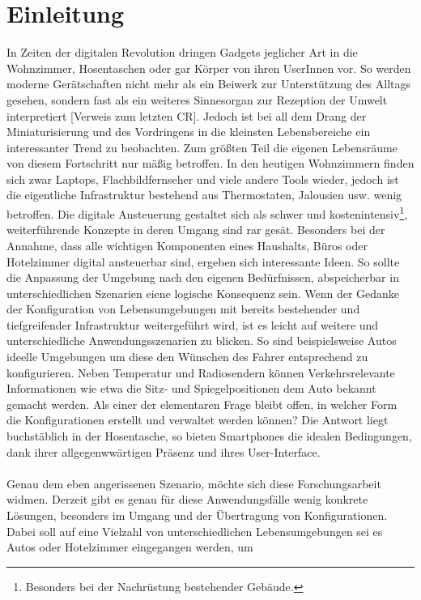\chapter{Einleitung}

In Zeiten der digitalen Revolution dringen Gadgets jeglicher Art in die Wohnzimmer, Hosentaschen oder gar Körper von ihren UserInnen vor. So werden moderne Gerätschaften 
nicht mehr als ein Beiwerk zur Unterstützung des Alltags gesehen, sondern fast als ein weiteres Sinnesorgan zur Rezeption der Umwelt interpretiert [Verweis zum letzten CR]. 
Jedoch ist bei all dem Drang der Miniaturisierung und des Vordringens in die kleinsten Lebensbereiche ein interessanter Trend zu beobachten. 
Zum größten Teil die eigenen Lebensräume von diesem Fortschritt nur mäßig betroffen. In den heutigen Wohnzimmern finden sich zwar Laptops, Flachbildfernseher und viele andere 
Tools wieder, jedoch ist die eigentliche Infrastruktur bestehend aus Thermostaten, Jalousien usw. wenig betroffen. Die digitale Ansteuerung gestaltet sich als schwer und
kostenintensiv\footnote{Besonders bei der Nachrüstung bestehender Gebäude.}, weiterführende  Konzepte in deren Umgang sind rar gesät. Besonders bei der Annahme, dass alle 
wichtigen Komponenten eines Haushalts, Büros oder Hotelzimmer digital ansteuerbar sind, ergeben sich interessante Ideen. So sollte die Anpassung der Umgebung nach den eigenen
 Bedürfnissen, abspeicherbar in unterschiedlichen Szenarien eiene logische Konsequenz sein. 
Wenn der Gedanke der Konfiguration von Lebensumgebungen mit bereits bestehender und tiefgreifender Infrastruktur weitergeführt wird, ist es leicht auf weitere und 
unterschiedliche Anwendungsszenarien zu blicken. 
So sind beispielsweise Autos ideelle Umgebungen um diese den Wünschen des Fahrer entsprechend zu konfigurieren. Neben Temperatur und Radiosendern können Verkehrsrelevante 
Informationen wie etwa die Sitz- und Spiegelpositionen dem Auto bekannt gemacht werden. Als einer der elementaren Frage bleibt offen, in welcher Form die Konfigurationen 
erstellt und verwaltet werden können? Die Antwort liegt buchstäblich in der Hosentasche, so bieten Smartphones die idealen Bedingungen, dank ihrer allgegenwwärtigen Präsenz 
und ihres User-Interface.
\\\\
Genau dem eben angerissenen Szenario, möchte sich diese Forschungsarbeit widmen. Derzeit gibt es genau für diese Anwendungsfälle wenig konkrete Lösungen, besonders im 
Umgang und der Übertragung von Konfigurationen. Dabei soll auf eine Vielzahl von unterschiedlichen Lebensumgebungen sei es Autos oder Hotelzimmer eingegangen werden, um 
